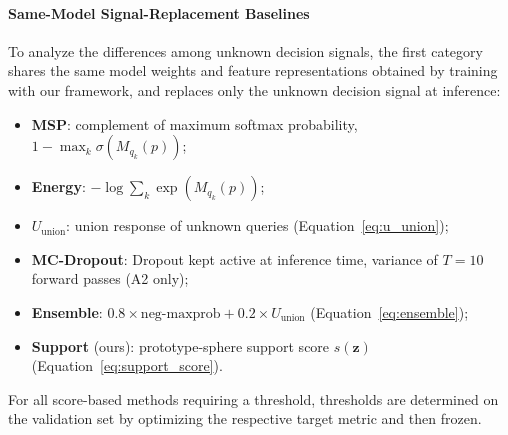 \documentclass[3p,twocolumn,authoryear]{elsarticle}
\newcommand{\bz}{\mathbf{z}}                              %
\begin{document}
\paragraph{Same-Model Signal-Replacement Baselines}
To analyze the differences among unknown decision signals, the first category shares the
same model weights and feature representations obtained by training with our framework,
and replaces only the unknown decision signal at inference:
\begin{itemize}[nosep]
  \item \textbf{MSP}: complement of maximum softmax probability, $1 - \max_k \sigma(M_{q_k}(p))$;
  \item \textbf{Energy}: $-\log \sum_k \exp(M_{q_k}(p))$;
  \item \textbf{$U_{\text{union}}$}: union response of unknown queries
        (Equation~\eqref{eq:u_union});
  \item \textbf{MC-Dropout}: Dropout kept active at inference time, variance of $T=10$
        forward passes (A2 only);
  \item \textbf{Ensemble}: $0.8 \times \text{neg-maxprob} + 0.2 \times U_{\text{union}}$
        (Equation~\eqref{eq:ensemble});
  \item \textbf{Support} (ours): prototype-sphere support score $s(\bz)$
        (Equation~\eqref{eq:support_score}).
\end{itemize}
For all score-based methods requiring a threshold, thresholds are determined on the
validation set by optimizing the respective target metric and then frozen.
\end{document}
